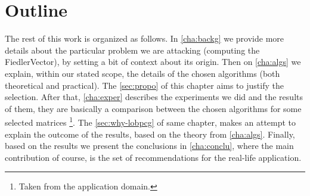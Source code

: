 \section{Outline}

The rest of this work is organized as follows. In \cref{cha:backg} we
provide more details about the particular problem we are attacking
(computing the \gls{FiedlerVector}), by setting a bit of context about
its origin. Then on \cref{cha:algs} we explain, within
our stated scope, the details of the chosen algorithms (both
theoretical and practical). The \cref{sec:propo} of this chapter aims
to justify the selection.  After that, \cref{cha:exper}
describes the experiments we did and the results of them, they are
basically a comparison between the chosen algorithms for some selected
matrices \footnote{Taken
  from the application domain.}. The \cref{sec:why-lobpcg} of same
chapter,  makes an attempt to explain the outcome of the results,
based on the theory from \cref{cha:algs}. Finally, based  
on the results we present the conclusions in \cref{cha:conclu}, where
the main contribution of course, is the set of recommendations for the
real-life application.

